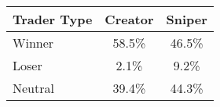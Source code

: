 \begin{tabular}{lcc}
\toprule
Trader Type & Creator & Sniper \\
\midrule
Winner & 58.5\% & 46.5\% \\
Loser & 2.1\% & 9.2\% \\
Neutral & 39.4\% & 44.3\% \\
\bottomrule
\end{tabular}